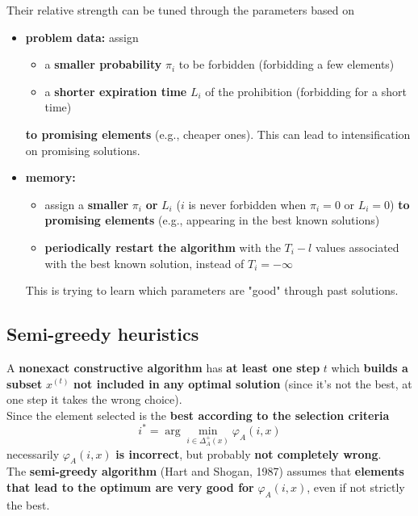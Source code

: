 \documentclass[11pt]{article}
\begin{document}
	Their relative strength can be tuned through the parameters based on
	\begin{itemize}
		\item \textbf{problem data:} assign
		\begin{itemize}
			\item a \textbf{smaller probability} $\pi_i$ to be forbidden (forbidding a few elements)
			
			\item a \textbf{shorter expiration time} $L_i$ of the prohibition (forbidding for a short time)
		\end{itemize}
		\textbf{to promising elements} (e.g., cheaper ones). This can lead to intensification on promising solutions. \\
		
		\item \textbf{memory:}
		\begin{itemize}
			\item assign a \textbf{smaller} $\pi_i$ \textbf{or} $L_i$ ($i$ is never forbidden when $\pi_i = 0$ or $L_i = 0$) \textbf{to promising elements} (e.g., appearing in the best known solutions)
			
			\item \textbf{periodically restart the algorithm} with the $T_i - l$ values associated with the best known solution, instead of $T_i = - \infty$
		\end{itemize}
		This is trying to learn which parameters are "good" through past solutions.\\
	\end{itemize}
	
	\newpage
	
	\subsection{Semi-greedy heuristics}
	A \textbf{nonexact constructive algorithm} has \textbf{at least one step} $t$ which \textbf{builds a subset} $x^{(t)}$ \textbf{not included in any optimal solution} (since it's not the best, at one step it takes the wrong choice).\\
	
	Since the element selected is the \textbf{best according to the selection criteria}
	$$ i^\ast = \arg \min_{i \in \Delta_A^+ (x)} \varphi_A (i, x)$$
	necessarily $\varphi_A (i, x)$ \textbf{is incorrect}, but probably \textbf{not completely wrong}.\\
	
	The \textbf{semi-greedy algorithm} (Hart and Shogan, 1987) assumes that \textbf{elements that lead to the optimum are very good for} $\varphi_A (i, x)$, even if not strictly the best.\\
	
\end{document}
